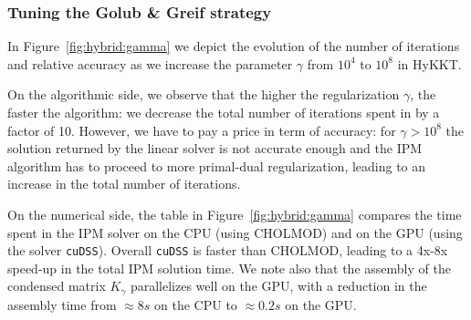 \begin{table}[!ht]
  \centering
  \caption{Comparing the performance of cuDSS with CHOLMOD.
    The matrix $K_\gamma$ is symmetric positive definite, with
    a size $n = 674,562$. The matrix is extremely sparse, with only $7,342,680$ non-zero entries ($0.002$\%).
    \label{tab:linsol:time}
    (A100 GPU)
  }
\end{table}

\subsubsection{Tuning the Golub \& Greif strategy}
\label{sec:num:tuninghykkt}
In Figure~\ref{fig:hybrid:gamma} we depict the evolution of the number
of \CG iterations and relative accuracy as we increase the parameter $\gamma$
from $10^4$ to $10^8$ in HyKKT.

On the algorithmic side, we observe that the higher the regularization $\gamma$,
the faster the \CG algorithm: we decrease the total number of iterations
spent in \CG by a factor of 10. However, we have to pay a price in term
of accuracy: for $\gamma > 10^8$ the solution returned by the linear solver
is not accurate enough and the IPM algorithm has to proceed to more
primal-dual regularization, leading to an increase in the total number of iterations.

On the numerical side, the table in Figure~\ref{fig:hybrid:gamma} compares
the time spent in the IPM solver on the CPU (using CHOLMOD) and on the GPU
(using the solver {\tt cuDSS}). Overall {\tt cuDSS} is
faster than CHOLMOD, leading to a 4x-8x speed-up in the total IPM solution time.
We note also that the assembly of the condensed matrix $K_\gamma$ parallelizes well
on the GPU, with a reduction in the assembly time from $\approx 8s$ on the CPU to $\approx 0.2s$ on the GPU.

